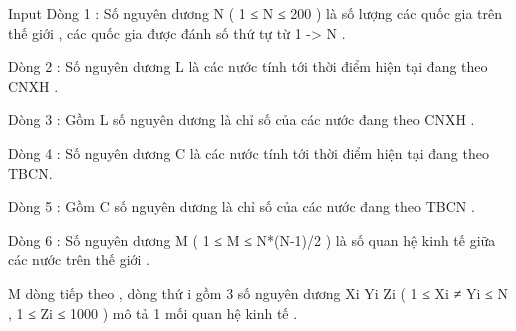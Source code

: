 Input
Dòng 1 : Số nguyên dương N ( 1 ≤ N ≤ 200 ) là số lượng các quốc gia trên thế giới , các quốc gia được đánh số thứ tự từ 1 -> N .   


   Dòng 2 : Số nguyên dương L là các nước tính tới thời điểm hiện tại đang theo CNXH .   


   Dòng 3 : Gồm L số nguyên dương là chỉ số của các nước đang theo CNXH .   


   Dòng 4 : Số nguyên dương C là các nước tính tới thời điểm hiện tại đang theo TBCN.   


   Dòng 5 : Gồm C số nguyên dương là chỉ số của các nước đang theo TBCN .   


   Dòng 6 : Số nguyên dương M ( 1 ≤ M ≤ N*(N-1)/2 ) là số quan hệ kinh tế giữa các nước trên thế giới .   


   M dòng tiếp theo , dòng thứ i gồm 3 số nguyên dương Xi Yi Zi ( 1 ≤ Xi ≠ Yi ≤ N , 1 ≤ Zi ≤ 1000 ) mô tả 1 mối quan hệ kinh tế .